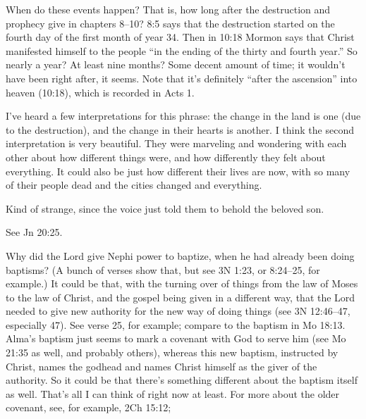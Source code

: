 		When do these events happen? That is, how long after the destruction and prophecy give in chapters 8--10? 8:5 says that the destruction started on the fourth day of the first month of year 34. Then in 10:18 Mormon says that Christ manifested himself to the people ``in the ending of the thirty and fourth year.'' So nearly a year? At least nine months? Some decent amount of time; it wouldn't have been right after, it seems. Note that it's definitely ``after the ascension'' into heaven (10:18), which is recorded in Acts 1.
		
		\begin{compactdesc}
		
		\item[1$\vert$]
		\begin{compactdesc}
		\item[great and marvelous change] I've heard a few interpretations for this phrase: the change in the land is one (due to the destruction), and the change in their hearts is another. I think the second interpretation is very beautiful. They were marveling and wondering with each other about how different things were, and how differently they felt about everything. It could also be just how different their lives are now, with so many of their people dead and the cities changed and everything.
		\end{compactdesc}
		
		\item[8$\vert$]
		\begin{compactdesc}
		\item[they thought it was an angel] Kind of strange, since the voice just told them to behold the beloved son.
		\end{compactdesc}
		
		\item[14$\vert$]
		\begin{compactdesc}
		\item[thrust/feel] See Jn 20:25.
		\end{compactdesc}
		
		\item[21$\vert$]
		\begin{compactdesc}
		\item[power to baptize] Why did the Lord give Nephi power to baptize, when he had already been doing baptisms? (A bunch of verses show that, but see 3N 1:23, or 8:24--25, for example.) It could be that, with the turning over of things from the law of Moses to the law of Christ, and the gospel being given in a different way, that the Lord needed to give new authority for the new way of doing things (see 3N 12:46--47, especially 47). See verse 25, for example; compare to the baptism in Mo 18:13. Alma's baptism just seems to mark a covenant with God to serve him (see Mo 21:35 as well, and probably others), whereas this new baptism, instructed by Christ, names the godhead and names Christ himself as the giver of the authority. So it could be that there's something different about the baptism itself as well. That's all I can think of right now at least. For more about the older covenant, see, for example, 2Ch 15:12;
		\end{compactdesc}
		

\end{compactdesc}
